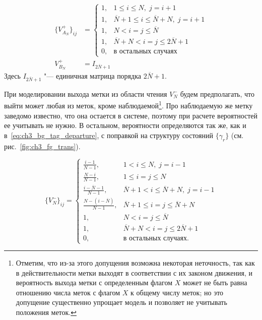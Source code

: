 \begin{equation}\label{eq:ch3_fg_tag_arrival}
	\begin{aligned}
		\{ V_{A_N}^+ \}_{ij} &= \begin{cases}
 			1, & 1 \leqslant i \leqslant N,\; j = i + 1\\
 			1, & \overline{N}+1 \leqslant i \leqslant \overline{N} + N ,\; j = i + 1\\
	 		1, & N < i = j \leqslant \overline{N}\\
 			1, & \overline{N} + N < i = j \leqslant 2\overline{N} + 1\\
 			0, & \text{в остальных случаях}
	 	\end{cases}\\
	 	V_{B_N}^+ &= I_{2\overline{N}+1}
	\end{aligned}
\end{equation}
Здесь $I_{2\overline{N}+1}$ "--- единичная матрица порядка $2\overline{N}+1$.

При моделировании выхода метки из области чтения $V_N^-$ будем предполагать, что выйти может любая из меток, кроме наблюдаемой\footnote{Отметим, что из-за этого допущения возможна некоторая неточность, так как в действительности метки выходят в соответствии с их законом движения, и вероятность выхода метки с определенным флагом $X$ может не быть равна отношению числа меток с флагом $X$ к общему числу меток; но это допущение существенно упрощает модель и позволяет не учитывать положения меток.}. Про наблюдаемую же метку заведомо известно, что она остается в системе, поэтому при расчете вероятностей ее учитывать не нужно. В остальном, вероятности определяются так же, как и в~\eqref{eq:ch3_bg_tag_departure}, с поправкой на структуру состояний $\{ \gamma_r \}$ (см. рис.~\ref{fig:ch3_fg_trans}).

\begin{equation}\label{eq:ch3_fg_tag_departure}
	\{ V_N^- \}_{ij} = \begin{cases}
 		\frac{i-1}{N-1}, & 1 < i \leqslant N,\; j = i - 1\\
 		\frac{N-i}{N-1}, & 1 \leqslant i = j \leqslant N\\
 		\frac{i - \overline{N} - 1}{N - 1}, & \overline{N} + 1 < i \leqslant \overline{N} + N,\; j = i - 1\\
 		\frac{N - (i - \overline{N})}{N - 1},  & \overline{N} + 1 \leqslant i = j \leqslant \overline{N} + N\\
 		1,               & N < i = j \leqslant \overline{N}\\
 		1,               & \overline{N} + N < i = j \leqslant 2\overline{N} + 1\\
 		0,               & \text{в остальных случаях}.
 	\end{cases}
\end{equation}





